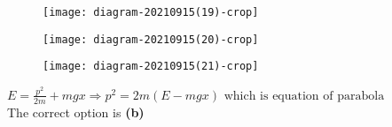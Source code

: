 \begin{enumerate}
\begin{tasks}
\begin{figure}[H]
		\centering
		\texttt{[image: diagram-20210915(19)-crop]}
	\end{figure}
	\task[\textbf{C.}]\begin{figure}[H]
		\centering
		\texttt{[image: diagram-20210915(20)-crop]}
	\end{figure}
	\task[\textbf{D.}]\begin{figure}[H]
		\centering
		\texttt{[image: diagram-20210915(21)-crop]}
	\end{figure}
\end{tasks}
\begin{answer}
	$E=\frac{p^{2}}{2 m}+m g x \Rightarrow p^{2}=2 m(E-m g x) \text { which is equation of parabola }$\\
	The correct option is \textbf{(b)}
\end{answer}
\end{enumerate}